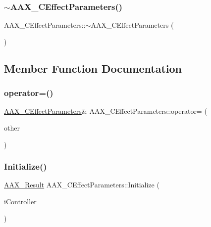 \mbox{\label{a01481_aa291588613f55461932e9b696c91d2d3}} 
\subsubsection{\texorpdfstring{$\sim$AAX\_CEffectParameters()}{~AAX\_CEffectParameters()}}
{\footnotesize\ttfamily A\+A\+X\+\_\+\+C\+Effect\+Parameters\+::$\sim$\+A\+A\+X\+\_\+\+C\+Effect\+Parameters (\begin{DoxyParamCaption}\item[{void}]{ }\end{DoxyParamCaption})}



\subsection{Member Function Documentation}
\mbox{\label{a01481_aea47eeb638da0d670fb92d3f1e0f9419}} 
\subsubsection{\texorpdfstring{operator=()}{operator=()}}
{\footnotesize\ttfamily \mbox{\hyperlink{a01481}{A\+A\+X\+\_\+\+C\+Effect\+Parameters}}\& A\+A\+X\+\_\+\+C\+Effect\+Parameters\+::operator= (\begin{DoxyParamCaption}\item[{const \mbox{\hyperlink{a01481}{A\+A\+X\+\_\+\+C\+Effect\+Parameters}} \&}]{other }\end{DoxyParamCaption})}

\mbox{\label{a01481_a245f235300b04f1c8b4c83831d296e22}} 
\subsubsection{\texorpdfstring{Initialize()}{Initialize()}}
{\footnotesize\ttfamily \mbox{\hyperlink{a00392_a4d8f69a697df7f70c3a8e9b8ee130d2f}{A\+A\+X\+\_\+\+Result}} A\+A\+X\+\_\+\+C\+Effect\+Parameters\+::\+Initialize (\begin{DoxyParamCaption}\item[{\mbox{\hyperlink{a01409}{I\+A\+C\+F\+Unknown}} $\ast$}]{i\+Controller }\end{DoxyParamCaption})\hspace{0.3cm}{\ttfamily [virtual]}}



